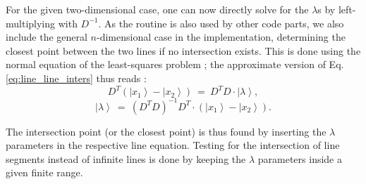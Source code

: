 For the given two-dimensional case, one can now directly solve for the $\lambda$s by left-multiplying with $D^{-1}$.
As the routine is also used by other code parts, we also include the general $n$-dimensional case in the implementation, 
determining the closest point between the two lines if no intersection exists.
This is done using the normal equation of the least-squares problem \cite[p. 793]{Arens2015}; 
the approximate version of Eq. \ref{eq:line_line_inters} thus reads \cite{wiki_line_line_intersection}: 
\begin{equation}
	D^T \left(\left|x_1\right> - \left|x_2\right>\right) \ =\  D^T D \cdot \left| \lambda \right>,
\end{equation}
\begin{equation}
	\left| \lambda \right> \ =\  \left( D^T D \right)^{-1} D^T \cdot \left( \left|x_1\right> - \left|x_2\right> \right).
\end{equation}

The intersection point (or the closest point) is thus found by inserting the $\lambda$ parameters in the respective line equation. 
Testing for the intersection of line segments instead of infinite lines is done by keeping the $\lambda$ parameters inside a given 
finite range.

